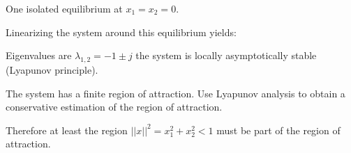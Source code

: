 \documentclass[10pt,a4paper]{scrartcl}
\begin{document}
\begin{multicols*}{3}

One isolated equilibrium at $x_1=x_2=0$.

Linearizing the system around this equilibrium yields:


Eigenvalues are $\lambda_{1,2}=-1\pm j$ \dahe the system is locally asymptotically stable (Lyapunov principle).

\finn

The system has a finite region of attraction. Use Lyapunov analysis to obtain a conservative estimation of the region of attraction.



Therefore at least the region $||x||^2=x_1^2+x_2^2<1$ must be part of the region of attraction.





\end{multicols*}
\end{document}

